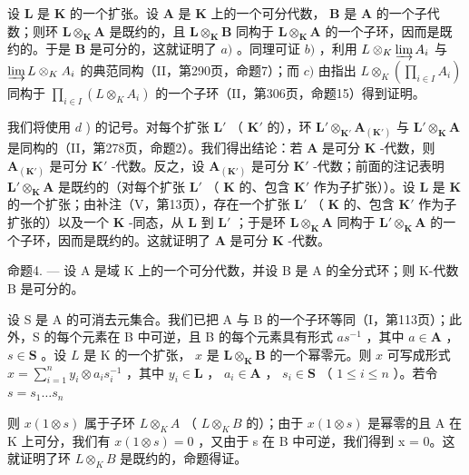 设 \(\mathbf{L}\) 是 \(\mathbf{K}\) 的一个扩张。设 \(\mathbf{A}\) 是 \(\mathbf{K}\) 上的一个可分代数， \(\mathbf{B}\) 是 \(\mathbf{A}\) 的一个子代数；则环 \(\mathbf{L} \otimes_{\mathbf{K}} \mathbf{A}\) 是既约的，且 \(\mathbf{L} \otimes_{\mathbf{K}} \mathbf{B}\) 同构于 \(\mathbf{L} \otimes_{\mathbf{K}} \mathbf{A}\) 的一个子环，因而是既约的。于是 \(\mathbf{B}\) 是可分的，这就证明了 \(a)\) 。同理可证 \(b)\) ，利用 \(L \otimes_{K} \varinjlim A_i\) 与 \(\varinjlim L \otimes_K A_i\) 的典范同构（II，第290页，命题7）；而 \(c)\) 由指出 \(L \otimes_K \left( \prod_{i \in I} A_i \right)\) 同构于 \(\prod_{i \in I} (L \otimes_K A_i)\) 的一个子环（II，第306页，命题15）得到证明。

我们将使用 \(d\) ) 的记号。对每个扩张 \(\mathbf{L}'\) （ \(\mathbf{K}'\) 的），环 \(\mathbf{L}' \otimes_{\mathbf{K}'} \mathbf{A}_{(\mathbf{K}')}\) 与 \(\mathbf{L}' \otimes_{\mathbf{K}} \mathbf{A}\) 是同构的（II，第278页，命题2）。我们得出结论：若 \(\mathbf{A}\) 是可分 \(\mathbf{K}\) -代数，则 \(\mathbf{A}_{(\mathbf{K}')}\) 是可分 \(\mathbf{K}'\) -代数。反之，设 \(\mathbf{A}_{(\mathbf{K}')}\) 是可分 \(\mathbf{K}'\) -代数；前面的注记表明 \(\mathbf{L}' \otimes_{\mathbf{K}} \mathbf{A}\) 是既约的（对每个扩张 \(\mathbf{L}'\) （ \(\mathbf{K}\) 的、包含 \(\mathbf{K}'\) 作为子扩张））。设 \(\mathbf{L}\) 是 \(\mathbf{K}\) 的一个扩张；由补注（V，第13页），存在一个扩张 \(\mathbf{L}'\) （ \(\mathbf{K}\) 的、包含 \(\mathbf{K}'\) 作为子扩张的）以及一个 \(\mathbf{K}\) -同态，从 \(\mathbf{L}\) 到 \(\mathbf{L}'\) ；于是环 \(\mathbf{L} \otimes_{\mathbf{K}} \mathbf{A}\) 同构于 \(\mathbf{L}' \otimes_{\mathbf{K}} \mathbf{A}\) 的一个子环，因而是既约的。这就证明了 \(\mathbf{A}\) 是可分 \(\mathbf{K}\) -代数。

命题4. --- 设 A 是域 K 上的一个可分代数，并设 B 是 A 的全分式环；则 K-代数 B 是可分的。

设 S 是 A 的可消去元集合。我们已把 A 与 B 的一个子环等同（I，第113页）；此外，S 的每个元素在 B 中可逆，且 B 的每个元素具有形式 \(as^{-1}\) ，其中 \(a \in \mathbf{A}\) ， \(s \in \mathbf{S}\) 。设 \(L\) 是 K 的一个扩张， \(x\) 是 \(\mathbf{L} \otimes_{\mathbf{K}} \mathbf{B}\) 的一个幂零元。则 \(x\) 可写成形式 \(x = \sum_{i=1}^{n} y_i \otimes a_i s_i^{-1}\) ，其中 \(y_i \in \mathbf{L}\) ， \(a_i \in \mathbf{A}\) ， \(s_i \in \mathbf{S}\) （ \(1 \leqslant i \leqslant n\) ）。若令 \(s = s_1 \ldots s_n\)

则 \(x(1 \otimes s)\) 属于子环 \(L \otimes_{K} A\) （ \(L \otimes_{K} B\) 的）；由于 \(x(1 \otimes s)\) 是幂零的且 A 在 K 上可分，我们有 \(x(1 \otimes s) = 0\) ，又由于 s 在 B 中可逆，我们得到 x = 0。这就证明了环 \(L \otimes_{K} B\) 是既约的，命题得证。

